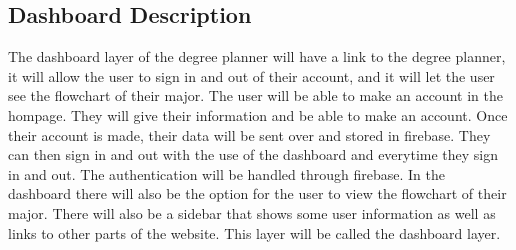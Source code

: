 \subsection{Dashboard Description}
    The dashboard layer of the degree planner will have a link to the degree planner, it will allow the user to sign in and out of their account, and it will let the user see the flowchart of their major. The user will be able to make an account in the hompage. They will give their information and be able to make an account. Once their account is made, their data will be sent over and stored in firebase. They can then sign in and out with the use of the dashboard and everytime they sign in and out. The authentication will be handled through firebase. In the dashboard there will also be the option for the user to view the flowchart of their major. There will also be a sidebar that shows some user information as well as links to other parts of the website. This layer will be called the dashboard layer. 